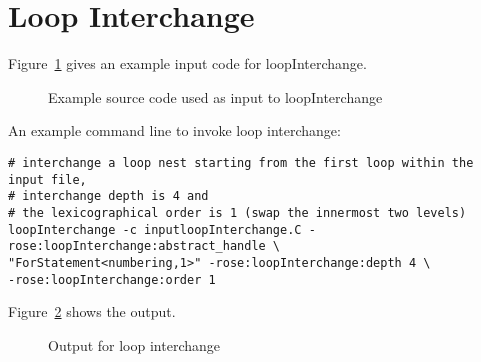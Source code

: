 \clearpage %
\section{Loop Interchange}

Figure~\ref{Tutorial:exampleInputCode_LoopInterchangep} gives an example
input code for loopInterchange.

\begin{figure}[!h]
{\indent
  {\mySmallFontSize
      \begin{latexonly}
    
    \end{latexonly}
      \begin{htmlonly}
    
    \end{htmlonly}
  }
}
\caption{Example source code used as input to loopInterchange}
    \label{Tutorial:exampleInputCode_LoopInterchangep}
\end{figure}


An example command line to invoke loop interchange:
\begin{verbatim}
# interchange a loop nest starting from the first loop within the input file, 
# interchange depth is 4 and 
# the lexicographical order is 1 (swap the innermost two levels)
loopInterchange -c inputloopInterchange.C -rose:loopInterchange:abstract_handle \
"ForStatement<numbering,1>" -rose:loopInterchange:depth 4 \
-rose:loopInterchange:order 1
\end{verbatim}

Figure~\ref{Tutorial:exampleOutput_LoopInterchangep} shows the output.
\begin{figure}[!h]
{\indent
  {\mySmallFontSize
      \begin{latexonly}
    
    \end{latexonly}
      \begin{htmlonly}
    
    \end{htmlonly}
  }
}
\caption{Output for loop interchange}
    \label{Tutorial:exampleOutput_LoopInterchangep}
\end{figure}

